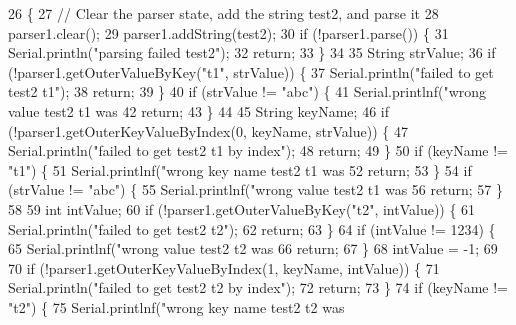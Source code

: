 \begin{DoxyCode}
26                \{
27     \textcolor{comment}{// Clear the parser state, add the string test2, and parse it}
28     parser1.clear();
29     parser1.addString(test2);
30     \textcolor{keywordflow}{if} (!parser1.parse()) \{
31         Serial.println(\textcolor{stringliteral}{"parsing failed test2"});
32         \textcolor{keywordflow}{return};
33     \}
34 
35     String strValue;
36     \textcolor{keywordflow}{if} (!parser1.getOuterValueByKey(\textcolor{stringliteral}{"t1"}, strValue)) \{
37         Serial.println(\textcolor{stringliteral}{"failed to get test2 t1"});
38         \textcolor{keywordflow}{return};
39     \}
40     \textcolor{keywordflow}{if} (strValue != \textcolor{stringliteral}{"abc"}) \{
41         Serial.printlnf(\textcolor{stringliteral}{"wrong value test2 t1 was %
42         \textcolor{keywordflow}{return};
43     \}
44 
45     String keyName;
46     \textcolor{keywordflow}{if} (!parser1.getOuterKeyValueByIndex(0, keyName, strValue)) \{
47         Serial.println(\textcolor{stringliteral}{"failed to get test2 t1 by index"});
48         \textcolor{keywordflow}{return};
49     \}
50     \textcolor{keywordflow}{if} (keyName != \textcolor{stringliteral}{"t1"}) \{
51         Serial.printlnf(\textcolor{stringliteral}{"wrong key name test2 t1 was %
52         \textcolor{keywordflow}{return};
53     \}
54     \textcolor{keywordflow}{if} (strValue != \textcolor{stringliteral}{"abc"}) \{
55         Serial.printlnf(\textcolor{stringliteral}{"wrong value test2 t1 was %
56         \textcolor{keywordflow}{return};
57     \}
58 
59     \textcolor{keywordtype}{int} intValue;
60     \textcolor{keywordflow}{if} (!parser1.getOuterValueByKey(\textcolor{stringliteral}{"t2"}, intValue)) \{
61         Serial.println(\textcolor{stringliteral}{"failed to get test2 t2"});
62         \textcolor{keywordflow}{return};
63     \}
64     \textcolor{keywordflow}{if} (intValue != 1234) \{
65         Serial.printlnf(\textcolor{stringliteral}{"wrong value test2 t2 was %
66         \textcolor{keywordflow}{return};
67     \}
68     intValue = -1;
69 
70     \textcolor{keywordflow}{if} (!parser1.getOuterKeyValueByIndex(1, keyName, intValue)) \{
71         Serial.println(\textcolor{stringliteral}{"failed to get test2 t2 by index"});
72         \textcolor{keywordflow}{return};
73     \}
74     \textcolor{keywordflow}{if} (keyName != \textcolor{stringliteral}{"t2"}) \{
75         Serial.printlnf(\textcolor{stringliteral}{"wrong key name test2 t2 was %
}}}}}
\end{DoxyCode}
